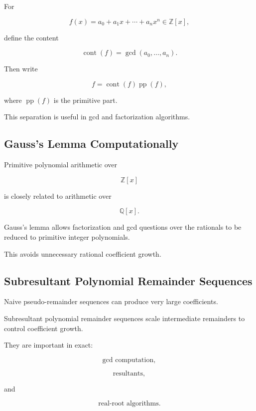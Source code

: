 For

\[
f(x)
=
a_0+a_1x+\cdots+a_nx^n
\in
\mathbb{Z}[x],
\]

define the content

\[
\boxed{
\operatorname{cont}(f)
=
\gcd(a_0,\ldots,a_n).
}
\]

Then write

\[
\boxed{
f
=
\operatorname{cont}(f)
\operatorname{pp}(f),
}
\]

where \(\operatorname{pp}(f)\) is the primitive part.

This separation is useful in gcd and factorization algorithms.

\subsection{Gauss's Lemma Computationally}
\label{subsec:gauss-lemma-computational}

Primitive polynomial arithmetic over

\[
\mathbb{Z}[x]
\]

is closely related to arithmetic over

\[
\mathbb{Q}[x].
\]

Gauss's lemma allows factorization and gcd questions over the rationals to
be reduced to primitive integer polynomials.

This avoids unnecessary rational coefficient growth.

\subsection{Subresultant Polynomial Remainder Sequences}
\label{subsec:subresultant-prs}

Naive pseudo-remainder sequences can produce very large coefficients.

Subresultant polynomial remainder sequences scale intermediate remainders
to control coefficient growth.

They are important in exact:

\[
\boxed{
\text{gcd computation},
}
\]

\[
\boxed{
\text{resultants},
}
\]

and

\[
\boxed{
\text{real-root algorithms}.
}
\]

